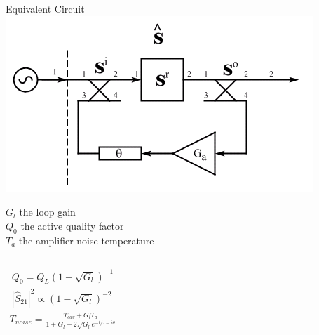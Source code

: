 \documentclass{beamer}
\begin{document}
\begin{frame}{Equivalent Circuit}
\centering
\includegraphics[width=.5\textwidth]{qmultiplier}

$G_l$ the loop gain\\
$Q_0$ the active quality factor\\
$T_a$ the amplifier noise temperature\\
\begin{columns}
\centering
\begin{align*}
Q_0 = Q_L(1-\sqrt{G_l})^{-1} \\
|\hat{S}_{21}|^2 \propto (1- \sqrt{G_l})^{-2}
\end{align*}
\centering
\begin{align*}
T_{noise} = \frac{T_{cav} + G_l T_a}{1 + G_l - 2\sqrt{G_l}e^{-t/\tau - i\theta}}
\end{align*}
\end{columns}
\end{frame}
\end{document}
